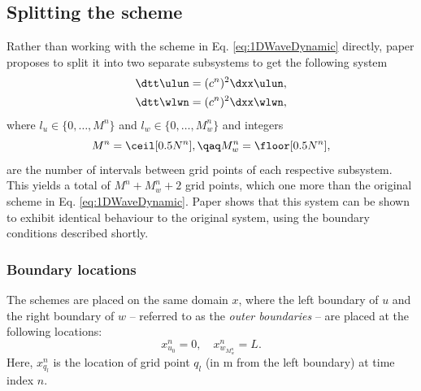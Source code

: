 \subsection{Splitting the scheme}
Rather than working with the scheme in Eq. \eqref{eq:1DWaveDynamic} directly, paper \citeP[G] proposes to split it into two separate subsystems to get the following system 
\begin{subequations}\label{eq:splitFDS}
    \begin{align}
        \dtt \ulun &= (c^n)^2\dxx \ulun,\\
        \dtt \wlwn &= (c^n)^2\dxx \wlwn,
    \end{align}
\end{subequations}
where $l_u \in \{0, \hdots, M^n\}$ and $l_w \in \{0, \hdots, M_w^n\}$ and integers 
\begin{equation}
    M^n =\ceil[0.5 N^n], \qaq M_w^n =\floor[0.5 N^n],
\end{equation}
are the number of intervals between grid points of each respective subsystem. This yields a total of $M^n + M_w^n + 2$ grid points, which one more than the original scheme in Eq. \eqref{eq:1DWaveDynamic}. Paper \citeP[G] shows that this system can be shown to exhibit identical behaviour to the original system, using the boundary conditions described shortly.

\subsubsection{Boundary locations}
The schemes are placed on the same domain $x$, where the left boundary of $u$ and the right boundary of $w$ -- referred to as the \textit{outer boundaries} -- are placed at the following locations:
\begin{equation}\label{eq:outerBoundaries}
    x_{u_0}^n = 0, \quad x_{w_{M_w^n}}^n = L.
\end{equation}
Here, $x_{q_l}^n$ is the location of grid point $q_l$ (in m from the left boundary) at time index $n$.

